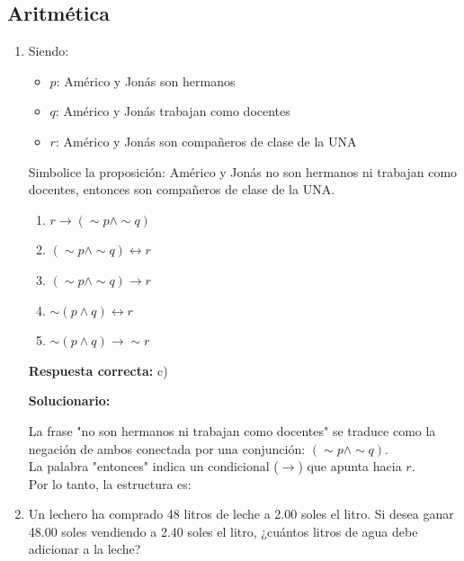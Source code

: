 
\subsection*{Aritmética}

\begin{enumerate}
	
	\item Siendo:
	\begin{itemize}
		\item[] $p$: Américo y Jonás son hermanos
		\item[] $q$: Américo y Jonás trabajan como docentes
		\item[] $r$: Américo y Jonás son compañeros de clase de la UNA
	\end{itemize}
	
	Simbolice la proposición:
	Américo y Jonás no son hermanos ni trabajan como docentes, entonces son compañeros de clase de la UNA.
	
	\begin{enumerate}[label=\alph*)]
		\item $r \rightarrow (\sim p \wedge \sim q)$
		\item $(\sim p \wedge \sim q) \leftrightarrow r$
		\item $(\sim p \wedge \sim q) \rightarrow r$
		\item $\sim (p \wedge q) \leftrightarrow r$
		\item $\sim (p \wedge q) \rightarrow \sim r$
	\end{enumerate}
	\textbf{Respuesta correcta:} c)
	
	\vspace{2mm}
	\textbf{Solucionario:}
	
	La frase "no son hermanos ni trabajan como docentes" se traduce como la negación de ambos conectada por una conjunción: $(\sim p \wedge \sim q)$.\\
	La palabra "entonces" indica un condicional ($\rightarrow$) que apunta hacia $r$.\\
	Por lo tanto, la estructura es: 
	
	\vspace{6mm}
	
	\item Un lechero ha comprado 48 litros de leche a 2.00 soles el litro. Si desea ganar 48.00 soles vendiendo a 2.40 soles el litro, ¿cuántos litros de agua debe adicionar a la leche?
	

\end{enumerate}
